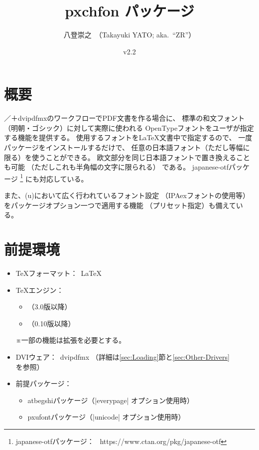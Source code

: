 \documentclass[uplatex,dvipdfmx,a4paper]{jsarticle}
\newcommand{\PkgVersion}{2.2}
\newcommand{\PkgDate}{2024/08/22}
\newcommand{\Pkg}[1]{\textsf{#1}}
\newcommand{\Note}{\par\noindent ※}
\newcommand{\Means}{：\ }
\begin{document}
\title{\Pkg{pxchfon} パッケージ}
\author{八登崇之\ （Takayuki YATO; aka.~``ZR''）}
\date{v\PkgVersion\quad[\PkgDate]}
\maketitle
\tableofcontents

\section{概要}
\label{sec:Introduction}

{\pLaTeX}／{\upLaTeX}＋dvipdfmxのワークフローでPDF文書を作る場合に、
標準の和文フォント（明朝・ゴシック）に対して実際に使われる
OpenTypeフォントをユーザが指定する機能を提供する。
使用するフォントを{\LaTeX}文書中で指定するので、
一度パッケージをインストールするだけで、
任意の日本語フォント（ただし等幅に限る）を使うことができる。
欧文部分を同じ日本語フォントで置き換えることも可能
（ただしこれも半角幅の文字に限られる）
である。
\Pkg{japanese-otf}パッケージ%
\footnote{\Pkg{japanese-otf}パッケージ\Means
  https://www.ctan.org/pkg/japanese-otf}%
にも対応している。

また、{(u)\pLaTeX}において広く行われているフォント設定
（IPAexフォントの使用等）をパッケージオプション一つで適用する機能
（プリセット指定）も備えている。

\section{前提環境}
\label{sec:Prerequisites}

\begin{itemize}
\item {\TeX}フォーマット\Means {\LaTeX}
\item {\TeX}エンジン\Means
  \begin{itemize}
  \item \pTeX（3.0版以降）
  \item \upTeX（0.10版以降）
  \end{itemize}
  \Note 一部の機能は{\eTeX}拡張を必要とする。
\item DVIウェア\Means dvipdfmx
  （詳細は\ref{sec:Loading}節と\ref{sec:Other-Drivers}を参照）
\item 前提パッケージ\Means
  \begin{itemize}
  \item \Pkg{atbegshi}パッケージ（|everypage| オプション使用時）
  \item \Pkg{pxufont}パッケージ（|unicode| オプション使用時）
  \end{itemize}
\end{itemize}
\end{document}
